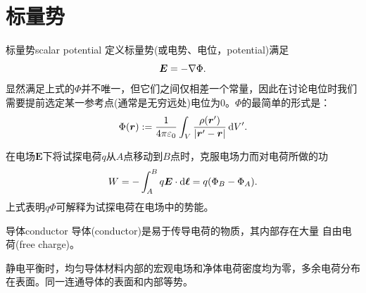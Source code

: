 \section{标量势}

\begin{definition}{标量势}{scalar potential}
    定义标量势(或电势、电位，potential)满足
    \begin{equation}
        \label{eqn:gradPhi}
        \bm E = -\nabla\Phi.
    \end{equation}
    显然满足上式的$\Phi$并不唯一，但它们之间仅相差一个常量，因此在讨论电位时我们需要提前选定某一参考点(通常是无穷远处)电位为0。$\Phi$的最简单的形式是：
    \begin{equation}
        \label{eqn:Phi-rho}
        \Phi(\bm r) := \frac1{4\pi\varepsilon_0}\int_V\frac{\rho(\bm r')}{\lvert\bm r' - \bm r\rvert}\mathop{}\!\mathrm{d} V'.
    \end{equation}
\end{definition}

\begin{corollary}
    在电场$\bm E$下将试探电荷$q$从$A$点移动到$B$点时，克服电场力而对电荷所做的功
    \begin{equation}
        \label{eq:ed-potential-difference-work}
        W = -\int_A^Bq\bm E \cdot \mathop{}\!\mathrm{d}\bm\ell = q(\Phi_B - \Phi_A).
    \end{equation}
    上式表明$q\Phi$可解释为试探电荷在电场中的势能。
\end{corollary}

\begin{definition}
    {导体}{conductor}
    导体(conductor)是易于传导电荷的物质，其内部存在大量%
    自由电荷(free charge)。
\end{definition}

\begin{corollary}
    静电平衡时，均匀导体材料内部的宏观电场和净体电荷密度均为零，多余电荷分布在表面。同一连通导体的表面和内部等势。
\end{corollary}

